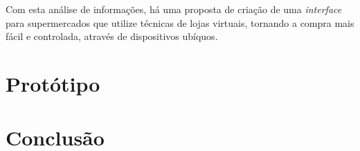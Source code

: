 \documentclass{article}
\begin{document}
Com esta análise de informações, há uma proposta de criação de uma
\emph{interface} para supermercados que utilize técnicas de lojas virtuais,
tornando a compra mais fácil e controlada, através de dispositivos ubíquos.

\section{Protótipo}

\section{Conclusão}



\end{document}
